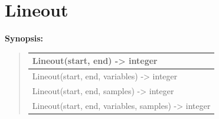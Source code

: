 \documentclass[letterpaper,10pt,english]{sphinxmanual}
\begin{document}
\begin{DUlineblock}{0em}
\item[] 
\end{DUlineblock}


\section{Lineout}
\label{functions:lineout}
\begin{DUlineblock}{0em}
\item[] \textbf{Synopsis:}
\end{DUlineblock}
\begin{quote}

\begin{tabulary}{\linewidth}{|L|}
\hline

Lineout(start, end) -\textgreater{} integer
\\
\hline
Lineout(start, end, variables) -\textgreater{} integer
\\
\hline
Lineout(start, end, samples) -\textgreater{} integer
\\
\hline
Lineout(start, end, variables, samples) -\textgreater{} integer
\\
\hline\end{tabulary}

\end{quote}
\end{document}
